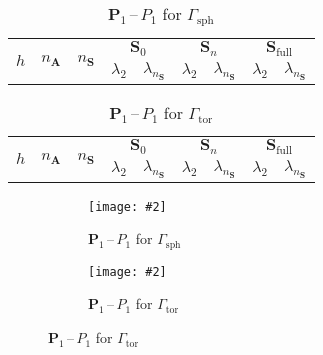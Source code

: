 \documentclass[12pt]{article}
\newcommand{\includegraphicsw}[2][1.]{\texttt{[image: \#2]}}
\newcommand{\vect}[1]{\boldsymbol{\mathbf{#1}}}
\newcommand{\sphere}{{\Gamma_{\text{sph}}}}
\newcommand{\tor}{{\Gamma_{\text{tor}}}}
\begin{document}
\begin{table}[h!]
	\centering
	\caption{$\vect P_1$\,--\,$P_1$ for $\sphere$} 
	\label{tab:p1p1}
	\small
	\begin{tabular}[1.3]{|c|c|c|c|c|c|c|c|c|}
		\hline
		\multirow{2}{*}{$h$} & \multirow{2}{*}{$n_{\vect A}$} & \multirow{2}{*}{$n_{\vect S}$} & \multicolumn{2}{c|}{$\vect S_0$} & \multicolumn{2}{c|}{$\vect S_n$} & \multicolumn{2}{c|}{$\vect S_{\text{full}}$} \\ 
		\cline{4-9}
		& & & $\lambda_2$ & $\lambda_{n_{\vect S}}$ & $\lambda_2$ & $\lambda_{n_{\vect S}}$ & $\lambda_2$ & $\lambda_{n_{\vect S}}$ \\ 
		\hline
		
%		
	\end{tabular}
\end{table}
\begin{table}[h!]
	\centering
	\caption{$\vect P_1$\,--\,$P_1$ for $\tor$} 
	\label{tab:p1p1_tor}
	\small
	\begin{tabular}[1.3]{|c|c|c|c|c|c|c|c|c|}
		\hline
		\multirow{2}{*}{$h$} & \multirow{2}{*}{$n_{\vect A}$} & \multirow{2}{*}{$n_{\vect S}$} & \multicolumn{2}{c|}{$\vect S_0$} & \multicolumn{2}{c|}{$\vect S_n$} & \multicolumn{2}{c|}{$\vect S_{\text{full}}$} \\ 
		\cline{4-9}
		& & & $\lambda_2$ & $\lambda_{n_{\vect S}}$ & $\lambda_2$ & $\lambda_{n_{\vect S}}$ & $\lambda_2$ & $\lambda_{n_{\vect S}}$ \\ 
		\hline
		
	\end{tabular}
\end{table}
\vfill
\begin{figure}[h]
	\centering
	\begin{subfigure}{.49\linewidth}
		\centering
		\includegraphicsw{sphere_2_P1P1.png}
		\caption{$\vect P_1$\,--\,$P_1$ for $\sphere$}
	\end{subfigure}%
	\hfill
	\begin{subfigure}{.49\linewidth}
		\centering
		\includegraphicsw{torus_P1P1.png}
		\caption{$\vect P_1$\,--\,$P_1$ for $\tor$}
	\end{subfigure}
\end{figure}
\vfill
\end{document}
